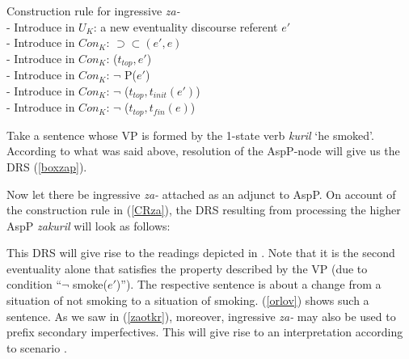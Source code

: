 \documentclass[output=paper,colorlinks,citecolor=brown]{langscibook}
\begin{document}
\ea\label{CRza} Construction rule for ingressive \textit{za-} \\
- Introduce in $U_K$: a new eventuality discourse referent $e'$\\
- Introduce in $Con_K$: $\supset\subset (e',e)$\\
- Introduce in $Con_K$: ($t_{top},e'$)\\
- Introduce in $Con_K$: $\neg$ P($e'$)\\
- Introduce in $Con_K$: $\neg$ ($t_{top},t_{init}(e')$)\\
- Introduce in $Con_K$: $\neg$ ($t_{top},t_{fin}(e)$)\\
\z

\noindent Take a sentence whose VP is formed by the 1-state verb \textit{kuril} `he smoked'. According to what was said above, resolution of the AspP-node will give us the DRS (\ref{boxzap}). 


\noindent Now let there be ingressive \textit{za-} attached as an adjunct to AspP. On account of the construction rule in (\ref{CRza}), the DRS resulting from processing the higher AspP \textit{zakuril} will look as follows:


\noindent This DRS will give rise to the readings depicted in . Note that it is the second eventuality alone that satisfies the property described by the VP (due to condition ``$\neg$ smoke($e'$)''). The respective sentence is about a change from a situation of not smoking to a situation of smoking.
(\ref{orlov}) shows such a sentence. 
As we saw in (\ref{zaotkr}), moreover, ingressive \textit{za-} may also be used to prefix secondary imperfectives. This will give rise to an interpretation according to scenario . 
\end{document}
